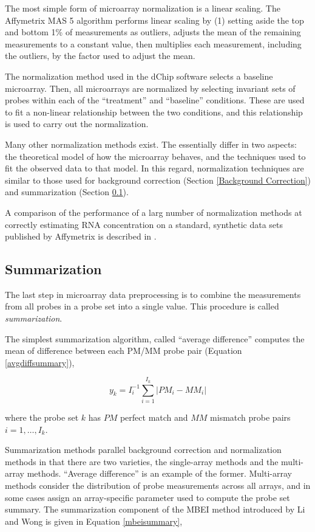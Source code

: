 The most simple form of microarray normalization is a linear scaling.  The
Affymetrix MAS 5 algorithm \cite{mas5} performs linear scaling by (1) setting
aside the top and bottom 1\% of measurements as outliers, adjusts the mean of
the remaining measurements to a constant value, then multiplies each
measurement, including the outliers, by the factor used to adjust the mean.

The normalization method used in the dChip software \cite{mbei,dchip} selects a
baseline microarray.   Then, all microarrays are normalized by selecting
invariant sets of probes within each of the ``treatment'' and ``baseline''
conditions.  These are used to fit a non-linear relationship between the two
conditions, and this relationship is used to carry out the normalization.

Many other normalization methods exist.  The essentially differ in two aspects:
the theoretical model of how the microarray behaves, and the techniques used to
fit the observed data to that model.  In this regard, normalization techniques
are similar to those used for background correction (Section \ref{Background
Correction}) and summarization (Section \ref{Summarization}).

A comparison of the performance of a larg number of normalization methods at
correctly estimating RNA concentration on a standard, synthetic data sets
published by Affymetrix is described in \cite{affybench}.

\subsection{Summarization}
\label{Summarization}

The last step in microarray data preprocessing is to combine the measurements
from all probes in a probe set into a single value.  This procedure is called
\emph{summarization}.

The simplest summarization algorithm, called ``average difference''
\cite{affy4} computes the mean of difference between each PM/MM probe pair
(Equation \ref{avgdiffsummary}),

\begin{equation}
\label{avgdiffsummary}
y_{k} = I_i^{-1}{\sum_{i=1}^{I_k} |PM_i-MM_i|}
\end{equation}

where the probe set $k$ has $PM$ perfect match and $MM$ mismatch probe pairs $i
= 1,\dots,I_k$.

Summarization methods parallel background correction and normalization methods
in that there are two varieties, the single-array methods and the multi-array
methods.  ``Average difference'' is an example of the former.  Multi-array
methods consider the distribution of probe measurements across all arrays, and
in some cases assign an array-specific parameter used to compute the probe set
summary.  The summarization component of the MBEI method introduced by Li and
Wong \cite{mbei,dchip} is given in Equation \ref{mbeisummary},

